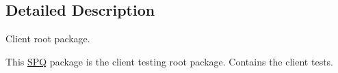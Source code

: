 \subsection{Detailed Description}
Client root package. 

This \mbox{\hyperlink{namespace_s_p_q}{S\+PQ}} package is the client testing root package. Contains the client tests. 